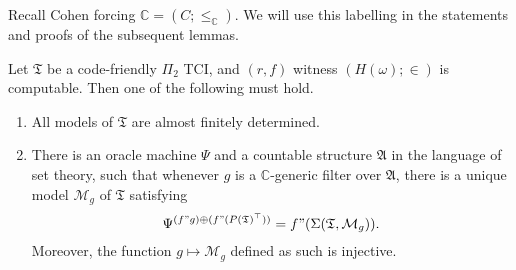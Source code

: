 \documentclass[12pt]{article}
\numberwithin{equation}{section}
\begin{document}
Recall Cohen forcing $\mathbb{C} = (C; \leq_{\mathbb{C}})$. We will use this labelling in the statements and proofs of the subsequent lemmas.

\begin{lem}\label{ctblegeneric}
Let $\mathfrak{T}$ be a code-friendly $\Pi_2$ TCI, and $(r, f)$ witness $(H(\omega); \in)$ is computable. Then one of the following must hold.
\begin{enumerate}[label=(\arabic*)]
    \item All models of $\mathfrak{T}$ are almost finitely determined.
    \item\label{3782} There is an oracle machine $\Psi$ and a countable structure $\mathfrak{A}$ in the language of set theory, such that whenever $g$ is a $\mathbb{C}$-generic filter over $\mathfrak{A}$, there is a unique model $\mathcal{M}_g$ of $\mathfrak{T}$ satisfying 
    \begin{equation*}
        \Psi^{(f" g) \oplus (f" (P(\mathfrak{T})^{\top}))} = f" (\Sigma(\mathfrak{T}, \mathcal{M}_g)) \text{.}
    \end{equation*}
    Moreover, the function $g \mapsto \mathcal{M}_g$ defined as such is injective.
\end{enumerate}
\end{lem}
\end{document}
